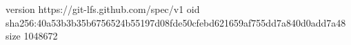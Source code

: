 version https://git-lfs.github.com/spec/v1
oid sha256:40a53b3b35b6756524b55197d08fde50cfebd621659af755dd7a840d0add7a48
size 1048672
